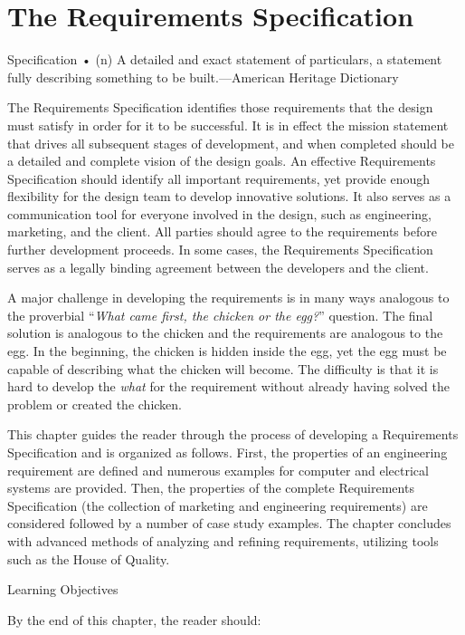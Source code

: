 \chapter{The Requirements Specification}
\graphicspath{ {./chapter03/Fig} }

Specification • (n) A detailed and exact statement of particulars, a
statement fully describing something to be built.---American Heritage
Dictionary

The Requirements Specification identifies those requirements that the
design must satisfy in order for it to be successful. It is in effect
the mission statement that drives all subsequent stages of development,
and when completed should be a detailed and complete vision of the
design goals. An effective Requirements Specification should identify
all important requirements, yet provide enough flexibility for the
design team to develop innovative solutions. It also serves as a
communication tool for everyone involved in the design, such as
engineering, marketing, and the client. All parties should agree to the
requirements before further development proceeds. In some cases, the
Requirements Specification serves as a legally binding agreement between
the developers and the client.

A major challenge in developing the requirements is in many ways
analogous to the proverbial ``\emph{What came first, the chicken or the
egg?}'' question. The final solution is analogous to the chicken and the
requirements are analogous to the egg. In the beginning, the chicken is
hidden inside the egg, yet the egg must be capable of describing what
the chicken will become. The difficulty is that it is hard to develop
the \emph{what} for the requirement without already having solved the
problem or created the chicken.

This chapter guides the reader through the process of developing a
Requirements Specification and is organized as follows. First, the
properties of an engineering requirement are defined and numerous
examples for computer and electrical systems are provided. Then, the
properties of the complete Requirements Specification (the collection of
marketing and engineering requirements) are considered followed by a
number of case study examples. The chapter concludes with advanced
methods of analyzing and refining requirements, utilizing tools such as
the House of Quality.

Learning Objectives

By the end of this chapter, the reader should:

